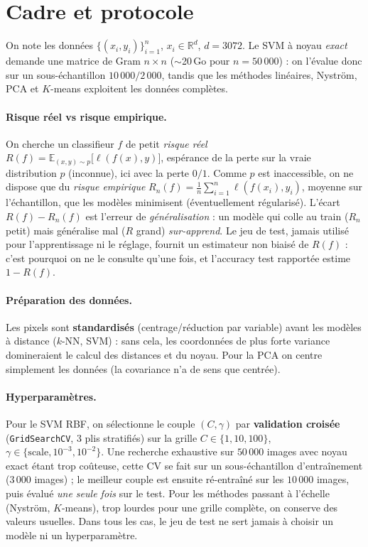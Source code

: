 \documentclass[11pt,a4paper]{article}
\newcommand{\R}{\mathbb{R}}
\begin{document}
\section{Cadre et protocole}
On note les données $\{(x_i,y_i)\}_{i=1}^n$, $x_i\in\R^{d}$, $d=3072$. Le SVM à
noyau \emph{exact} demande une matrice de Gram $n\times n$ ($\sim$20\,Go pour
$n=50\,000$) : on l'évalue donc sur un sous-échantillon $10\,000/2\,000$, tandis que
les méthodes linéaires, Nyström, PCA et $K$-means exploitent les données complètes.

\paragraph{Risque réel vs risque empirique.} On cherche un classifieur $f$ de petit
\emph{risque réel} $R(f)=\mathbb E_{(x,y)\sim p}\big[\ell(f(x),y)\big]$, espérance de
la perte sur la vraie distribution $p$ (inconnue), ici avec la perte $0/1$. Comme
$p$ est inaccessible, on ne dispose que du \emph{risque empirique}
$R_n(f)=\tfrac1n\sum_{i=1}^n \ell(f(x_i),y_i)$, moyenne sur l'échantillon, que les
modèles minimisent (éventuellement régularisé). L'écart $R(f)-R_n(f)$ est l'erreur
de \emph{généralisation} : un modèle qui colle au train ($R_n$ petit) mais
généralise mal ($R$ grand) \emph{sur-apprend}. Le jeu de test, jamais utilisé pour
l'apprentissage ni le réglage, fournit un estimateur non biaisé de $R(f)$ : c'est
pourquoi on ne le consulte qu'une fois, et l'accuracy test rapportée estime $1-R(f)$.

\paragraph{Préparation des données.} Les pixels sont \textbf{standardisés}
(centrage/réduction par variable) avant les modèles à distance ($k$-NN, SVM) : sans
cela, les coordonnées de plus forte variance domineraient le calcul des distances et
du noyau. Pour la PCA on centre simplement les données (la covariance n'a de sens
que centrée).

\paragraph{Hyperparamètres.} Pour le SVM RBF, on sélectionne le couple
$(C,\gamma)$ par \textbf{validation croisée} (\texttt{GridSearchCV}, $3$ plis
stratifiés) sur la grille $C\in\{1,10,100\}$, $\gamma\in\{\text{scale},10^{-3},
10^{-2}\}$. Une recherche exhaustive sur $50\,000$ images avec noyau exact étant
trop coûteuse, cette CV se fait sur un sous-échantillon d'entraînement
($3\,000$ images) ; le meilleur couple est ensuite ré-entraîné sur les $10\,000$
images, puis évalué \emph{une seule fois} sur le test. Pour les méthodes passant à
l'échelle (Nyström, $K$-means), trop lourdes pour une grille complète, on conserve
des valeurs usuelles. Dans tous les cas, le jeu de test ne sert jamais à choisir un
modèle ni un hyperparamètre.
\end{document}
